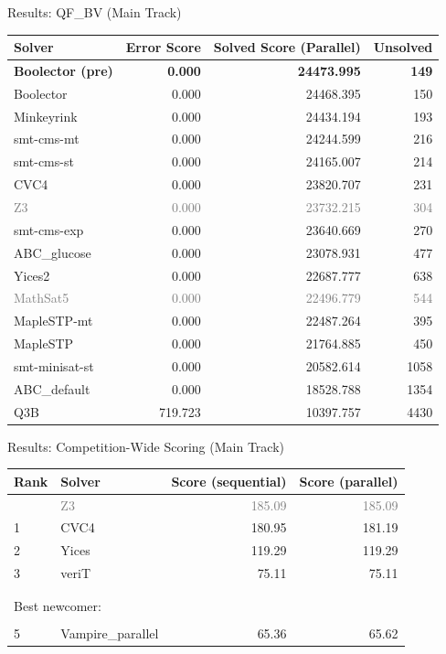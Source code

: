 \documentclass{beamer}
\begin{document}
\begin{frame}{Results: QF\_BV (Main Track)}
  \begin{tabular}{lrrr}
Solver          & Error Score & Solved Score (Parallel) & Unsolved \\ \hline
{\bf Boolector (pre)} & {\bf 0.000} & {\bf 24473.995} & {\bf 149} \\
Boolector 	& 0.000	& 24468.395 & 150 \\
Minkeyrink 	& 0.000	& 24434.194 & 193 \\
smt-cms-mt 	& 0.000	& 24244.599 & 216 \\
smt-cms-st 	& 0.000	& 24165.007 & 214 \\
CVC4 	        & 0.000	& 23820.707 & 231 \\
\textcolor{gray}{Z3} & \textcolor{gray}{0.000} & \textcolor{gray}{23732.215} & \textcolor{gray}{304} \\
smt-cms-exp 	& 0.000	& 23640.669 & 270 \\
ABC\_glucose 	& 0.000	& 23078.931 & 477 \\
Yices2 	        & 0.000	& 22687.777 & 638 \\
\textcolor{gray}{MathSat5} & \textcolor{gray}{0.000} & \textcolor{gray}{22496.779} & \textcolor{gray}{544} \\
MapleSTP-mt 	& 0.000	& 22487.264 & 395 \\
MapleSTP 	& 0.000	& 21764.885 & 450 \\
smt-minisat-st 	& 0.000	& 20582.614 & 1058 \\
ABC\_default 	& 0.000	& 18528.788 & 1354 \\
Q3B 	        & 719.723 & 10397.757 & 4430
  \end{tabular}  
\end{frame}


\begin{frame}{Results: Competition-Wide Scoring (Main Track)}
  \begin{tabular}{llrr}
    Rank & Solver & Score (sequential) & Score (parallel)\\ \hline
         & \textcolor{gray}{Z3} & \textcolor{gray}{185.09} & \textcolor{gray}{185.09} \\
    1    & CVC4   & 180.95             & 181.19 \\
    2    & Yices  & 119.29             & 119.29 \\
    3    & veriT  & 75.11              & 75.11 \\
    \\
    \\
    \multicolumn{3}{l}{Best newcomer:}\\
    \\
    5    & Vampire\_parallel & 65.36 & 65.62	
  \end{tabular}  
\end{frame}
\end{document}
